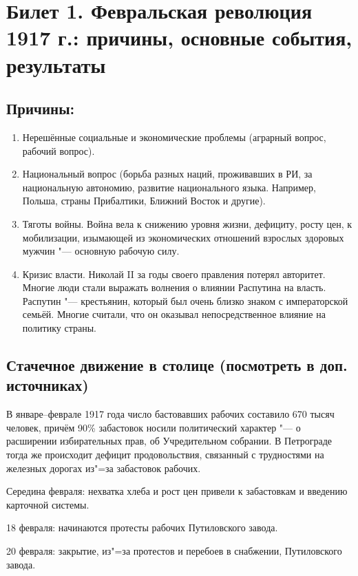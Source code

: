 \section{Билет 1. Февральская революция 1917 г.: причины, основные события, результаты}

\subsection{Причины:}

\begin{enumerate}
    \item Нерешённые социальные и экономические проблемы (аграрный вопрос, рабочий вопрос).
    \item Национальный вопрос (борьба разных наций, проживавших в РИ, за национальную автономию, развитие национального языка. Например, Польша, страны Прибалтики, Ближний Восток и другие).
    \item Тяготы войны. Война вела к снижению уровня жизни, дефициту, росту цен, к мобилизации, изымающей из экономических отношений взрослых здоровых мужчин "--- основную рабочую силу.
    \item Кризис власти. Николай II за годы своего правления потерял авторитет. Многие люди стали выражать волнения о влиянии Распутина на власть. Распутин "--- крестьянин, который был очень близко знаком с императорской семьёй. Многие считали, что он оказывал непосредственное влияние на политику страны.
\end{enumerate}

\subsection{Стачечное движение в столице (посмотреть в доп. источниках)}

В январе--феврале 1917 года число бастовавших рабочих составило 670 тысяч человек, причём 90\% забастовок носили политический характер "--- о расширении избирательных прав, об Учредительном собрании. В Петрограде тогда же происходит дефицит продовольствия, связанный с трудностями на железных дорогах из"=за забастовок рабочих.

Середина февраля: нехватка хлеба и рост цен привели к забастовкам и введению карточной системы.

18 февраля: начинаются протесты рабочих Путиловского завода.

20 февраля: закрытие, из"=за протестов и перебоев в снабжении, Путиловского завода.

